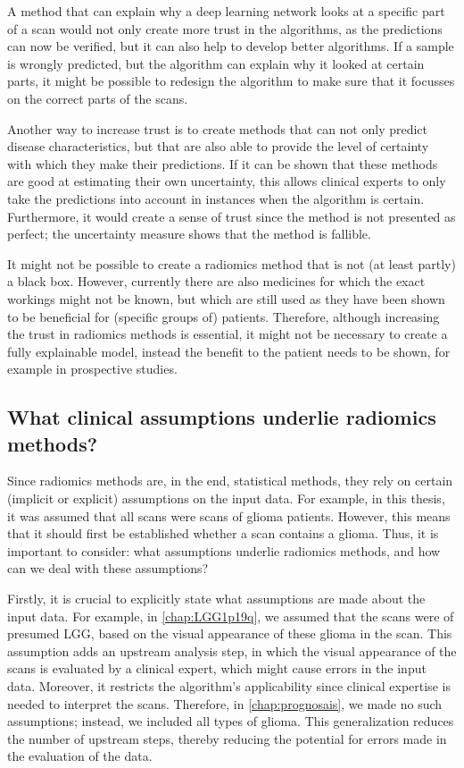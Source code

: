 A method that can explain why a deep learning network looks at a specific part of a scan would not only create more trust in the algorithms, as the predictions can now be verified, but it can also help to develop better algorithms.
If a sample is wrongly predicted, but the algorithm can explain why it looked at certain parts, it might be possible to redesign the algorithm to make sure that it focusses on the correct parts of the scans.

Another way to increase trust is to create methods that can not only predict disease characteristics, but that are also able to provide the level of certainty with which they make their predictions.
If it can be shown that these methods are good at estimating their own uncertainty, this allows clinical experts to only take the predictions into account in instances when the algorithm is certain.
Furthermore, it would create a sense of trust since the method is not presented as perfect; the uncertainty measure shows that the method is fallible.

It might not be possible to create a radiomics method that is not (at least partly) a black box.
However, currently there are also medicines for which the exact workings might not be known, but which are still used as they have been shown to be beneficial for (specific groups of) patients.
Therefore, although increasing the trust in radiomics methods is essential, it might not be necessary to create a fully explainable model, instead the benefit to the patient needs to be shown, for example in prospective studies.


\subsection{What clinical assumptions underlie radiomics methods?}

Since radiomics methods are, in the end, statistical methods, they rely on certain (implicit or explicit) assumptions on the input data.
For example, in this thesis, it was assumed that all scans were scans of glioma patients.
However, this means that it should first be established whether a scan contains a glioma.
Thus, it is important to consider: what assumptions underlie radiomics methods, and how can we deal with these assumptions?

Firstly, it is crucial to explicitly state what assumptions are made about the input data.
For example, in \cref{chap:LGG1p19q}, we assumed that the scans were of presumed \gls{LGG}, based on the visual appearance of these glioma in the scan.
This assumption adds an upstream analysis step, in which the visual appearance of the scans is evaluated by a clinical expert, which might cause errors in the input data.
Moreover, it restricts the algorithm's applicability since clinical expertise is needed to interpret the scans.
Therefore, in \cref{chap:prognosais}, we made no such assumptions; instead, we included all types of glioma.
This generalization reduces the number of upstream steps, thereby reducing the potential for errors made in the evaluation of the data.

